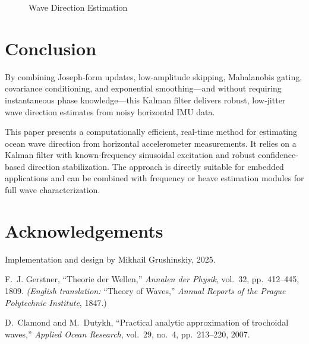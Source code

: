 \documentclass[11pt,letterpaper]{article}
\begin{document}
\begin{figure}[H]
    \centering
    \resizebox{\textwidth}{!}{}
    \caption{Wave Direction Estimation}
    \label{fig:waveDir}
\end{figure}

\section{Conclusion}
By combining Joseph‐form updates, low‐amplitude skipping, Mahalanobis gating, covariance conditioning, and exponential smoothing—and without requiring instantaneous phase knowledge—this Kalman filter delivers robust, low‐jitter wave direction estimates from noisy horizontal IMU data.\par
\vspace{1ex}
\noindent This paper presents a computationally efficient, real-time method for estimating ocean wave direction from horizontal accelerometer measurements. It relies on a Kalman filter with known-frequency sinusoidal excitation and robust confidence-based direction stabilization. The approach is directly suitable for embedded applications and can be combined with frequency or heave estimation modules for full wave characterization.

\section*{Acknowledgements}
Implementation and design by Mikhail Grushinskiy, 2025.

\begin{thebibliography}{9}
F.~J. Gerstner, ``Theorie der Wellen,'' 
\emph{Annalen der Physik}, vol.~32, pp.~412–445, 1809.  
\emph{(English translation: }``Theory of Waves,'' \emph{Annual Reports of the Prague Polytechnic Institute}, 1847.)

D.~Clamond and M.~Dutykh, ``Practical analytic approximation of trochoidal waves,'' 
\emph{Applied Ocean Research}, vol.~29, no.~4, pp.~213–220, 2007.
\end{thebibliography}
\end{document}
